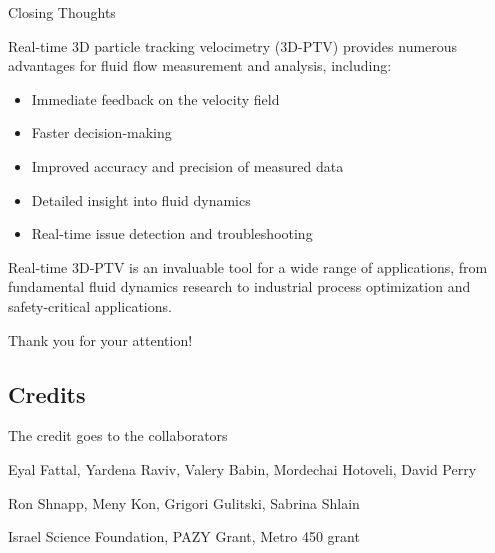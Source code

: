 \documentclass[aspectratio=43]{beamer}
\begin{document}
\begin{frame}{Closing Thoughts}

Real-time 3D particle tracking velocimetry (3D-PTV) provides numerous advantages for fluid flow measurement and analysis, including:

\begin{itemize}
\item Immediate feedback on the velocity field
\item Faster decision-making
\item Improved accuracy and precision of measured data
\item Detailed insight into fluid dynamics
\item Real-time issue detection and troubleshooting
\end{itemize}

Real-time 3D-PTV is an invaluable tool for a wide range of applications, from fundamental fluid dynamics research to industrial process optimization and safety-critical applications.

\bigskip
Thank you for your attention!

\end{frame}




\subsection{Credits}

\begin{frame}[label=credit-1a]{The credit goes to the collaborators }
\begin{multicols}{2}
\centering
{} 
\end{multicols}
\end{frame}
%
\begin{frame}[label=credit-2]
\begin{card}
Eyal Fattal, Yardena Raviv, Valery Babin, Mordechai Hotoveli, David Perry
\end{card}
\begin{card}[TAU]
Ron Shnapp, Meny Kon, Grigori Gulitski, Sabrina Shlain
\end{card}
\begin{card}[Funding]
Israel Science Foundation, PAZY Grant, Metro 450 grant
\end{card}
\end{frame}
%
\end{document}
